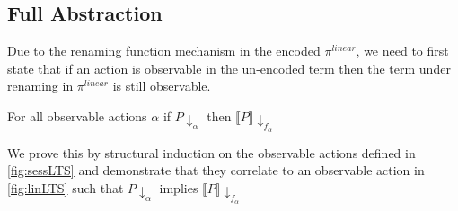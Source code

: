 




\subsection{Full Abstraction}

Due to the renaming function mechanism in the encoded $\pi^{linear}$, we need to first state that if an action is observable in the un-encoded term then the term under renaming in $\pi^{linear}$ is still observable.
\vspace{10pt}
\begin{lemma}
    For all observable actions $\alpha$ if $P \downarrow_{\alpha}$ then $\llbracket P \rrbracket \downarrow_{f_\alpha}$
    \label{Lem:ChannelRename}
\end{lemma}

We prove this by structural induction on the observable actions defined in \autoref{fig:sessLTS} and demonstrate that they correlate to an observable action in \autoref{fig:linLTS} such that $P \downarrow_\alpha$ implies $\llbracket P \rrbracket \downarrow_{f_{\alpha}}$

